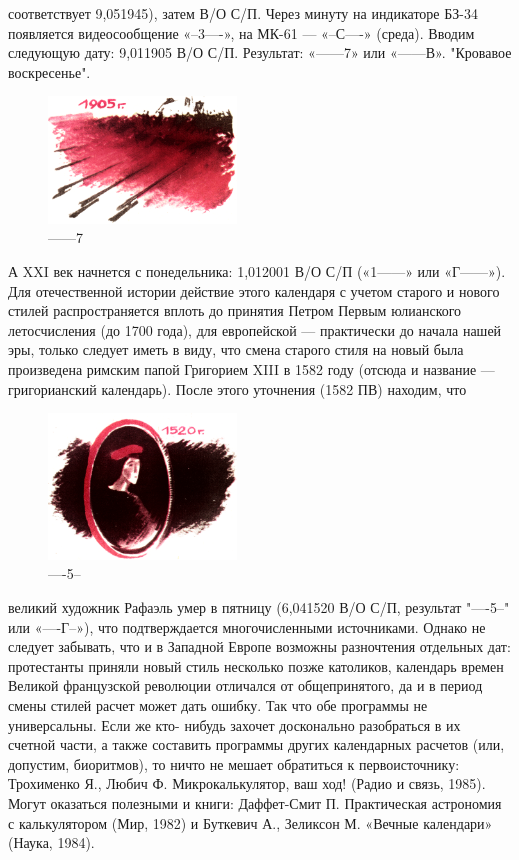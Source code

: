 \documentclass[11pt,a4paper,oneside]{article}
\begin{document}
соответствует 9,051945), затем В/О С/П. Через минуту на индикаторе БЗ-34
появляется видеосообщение «--3----»,
на МК-61 — «--С----» (среда).
Вводим следующую дату: 9,011905
В/О С/П. Результат: «------7» или
«------В». "Кровавое воскресенье".

\begin{figure}[H]
\includegraphics[width=5cm]{cal2}
\caption{------7}
\end{figure}

А XXI век начнется с понедельника:
1,012001 В/О С/П («1------» или
«Г------»).
Для отечественной истории действие этого календаря с учетом старого и нового стилей распространяется вплоть до принятия Петром Первым юлианского летосчисления (до 1700 года), для европейской — практически до начала нашей эры, только следует иметь в виду, что смена старого стиля на новый была произведена римским папой Григорием XIII в 1582 году (отсюда и название — григорианский календарь). После этого уточнения (1582 ПВ) находим, что

\begin{figure}[H]
\includegraphics[width=5cm]{cal3}
\caption{----5--}
\end{figure}

великий художник Рафаэль умер в пятницу (6,041520 В/О С/П, результат "----5--" или «----Г--»), что подтверждается многочисленными источниками. Однако не следует забывать, что и в Западной Европе возможны разночтения отдельных дат: протестанты приняли новый стиль несколько позже католиков, календарь времен Великой французской революции отличался от общепринятого, да и в период смены стилей расчет может дать ошибку. Так что обе программы не универсальны. Если же кто- нибудь захочет досконально разобраться в их счетной части, а также составить программы других календарных расчетов (или, допустим, биоритмов), то ничто не мешает обратиться к первоисточнику: Трохименко Я., Любич Ф. Микрокалькулятор, ваш ход! (Радио и связь, 1985). Могут оказаться полезными и книги: Даффет-Смит П. Практическая астрономия с калькулятором (Мир, 1982) и Буткевич А., Зеликсон М. «Вечные календари» (Наука, 1984).
\end{document}
